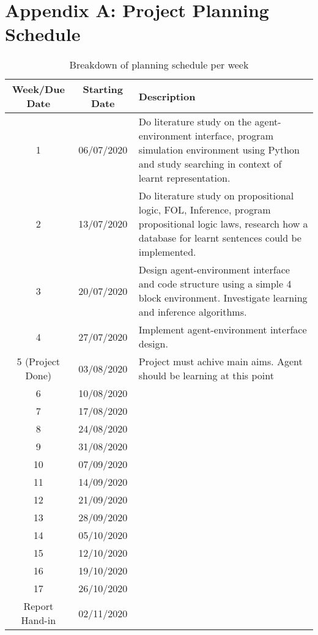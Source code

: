 \setcounter{table}{0}
\renewcommand{\thetable}{A.\arabic{table}}




\chapter{Appendix A:  Project Planning Schedule}

 \begin{table}[H]
  \begin{center}
    \begin{tabular}{|c|c|p{6cm}|} %
    \hline
      \textbf{Week/Due Date} & \textbf{Starting Date} & \textbf{Description}\\
      \hline
      \hline
      1 & 06/07/2020 & Do literature study on the agent-environment interface, program simulation environment using Python and study searching in context of learnt representation.\\ \hline
      2 & 13/07/2020 & Do literature study on propositional logic, FOL, Inference, program propositional logic laws, research how a database for learnt sentences could be implemented.\\ \hline
      3 & 20/07/2020 & Design agent-environment interface and code structure using a simple 4 block environment. Investigate learning and inference algorithms.\\ \hline
      4 & 27/07/2020 & Implement agent-environment interface design. \\ \hline
      5 (Project Done) & 03/08/2020 & Project must achive main aims. Agent should be learning at this point \\ \hline
      6 & 10/08/2020 & \\ \hline
      7 & 17/08/2020 & \\ \hline
      8 & 24/08/2020 & \\ \hline
      9 & 31/08/2020 & \\ \hline
      10 & 07/09/2020 &\\ \hline
      11 & 14/09/2020 & \\ \hline
      12 & 21/09/2020 & \\ \hline
      13 & 28/09/2020 & \\ \hline
      14 & 05/10/2020 & \\ \hline
      15 & 12/10/2020 & \\ \hline
      16 & 19/10/2020 & \\ \hline
      17 & 26/10/2020 & \\ \hline
      Report Hand-in & 02/11/2020  \\
      
      \hline
    \end{tabular}
  \end{center}
  \caption{Breakdown of planning schedule per week}
    \label{tab:tablea1}
\end{table}